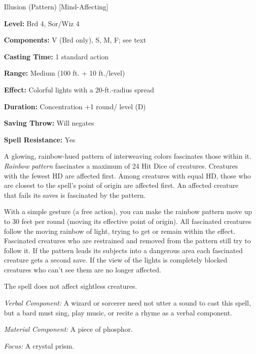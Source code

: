 
Illusion (Pattern) [Mind-Affecting]

\textbf{Level:} Brd 4, Sor/Wiz 4

\textbf{Components:} V (Brd only), S, M, F; see text

\textbf{Casting Time:} 1 standard action

\textbf{Range:} Medium (100 ft. + 10 ft./level)

\textbf{Effect:} Colorful lights with a 20-ft.-radius spread

\textbf{Duration:} Concentration +1 round/ level (D)

\textbf{Saving Throw:} Will negates

\textbf{Spell Resistance:} Yes

A glowing, rainbow-hued pattern of interweaving colors fascinates those within 
it. \textit{Rainbow pattern} fascinates a maximum of 24 Hit Dice of creatures. 
Creatures with the fewest HD are affected first. Among creatures with equal HD, 
those who are closest to the spell's point of origin are affected first. An affected 
creature that fails its saves is fascinated by the pattern.

With a simple gesture (a free action), you can make the rainbow pattern move up 
to 30 feet per round (moving its effective point of origin). All fascinated creatures 
follow the moving rainbow of light, trying to get or remain within the effect. 
Fascinated creatures who are restrained and removed from the pattern still try 
to follow it. If the pattern leads its subjects into a dangerous area each fascinated 
creature gets a second save. If the view of the lights is completely blocked creatures 
who can't see them are no longer affected.

The spell does not affect sightless creatures.

\textit{Verbal Component:} A wizard or sorcerer need not utter a sound to cast 
this spell, but a bard must sing, play music, or recite a rhyme as a verbal component.

\textit{Material Component:} A piece of phosphor.

\textit{Focus:} A crystal prism.

